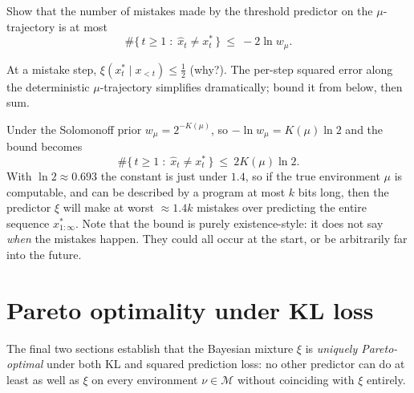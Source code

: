 \documentclass[fontsize=11pt, parskip=half]{scrartcl}
\newcommand{\Mc}{\mathcal{M}}
\begin{document}
\begin{exercise}
\label{prob:mistakes_ex}



Show that the number of mistakes made by the threshold predictor on the
$\mu$-trajectory is at most
\[
  \#\{\, t \geq 1 \;:\; \hat{x}_t \neq x_t^* \,\}
  ~\leq~ -2 \ln w_\mu.
\]

\begin{hint}
At a mistake step, $\xi(x_t^* \mid x_{<t}) \leq \tfrac12$ (why?).
The per-step squared error along the deterministic $\mu$-trajectory
simplifies dramatically; bound it from below, then sum.
\end{hint}
\end{exercise}


\begin{remark}
Under the Solomonoff prior $w_\mu = 2^{-K(\mu)}$, so $-\ln w_\mu = K(\mu)\ln 2$
and the bound becomes
\[
  \#\{\, t \geq 1 \;:\; \hat{x}_t \neq x_t^* \,\} ~\leq~ 2 K(\mu) \ln 2.
\]
With $\ln 2 \approx 0.693$ the constant is just under $1.4$, so if the true 
environment $\mu$ is computable, and can be described by a program at most $k$ bits long, 
then the predictor $\xi$ 
will make at worst $\approx 1.4 k$ mistakes over predicting the entire sequence $x^*_{1:\infty}$.
Note that the bound is purely existence-style: it does not say \emph{when}
the mistakes happen. They could all occur at the start, or be arbitrarily far into the future.
\end{remark}

\section{Pareto optimality under KL loss}\label{prob:kl}

The final two sections establish that the Bayesian mixture $\xi$ is
\emph{uniquely Pareto-optimal} under both KL and squared prediction loss:
no other predictor can do at least as well as $\xi$ on every environment
$\nu \in \Mc$ without coinciding with $\xi$ entirely. 

\end{document}
